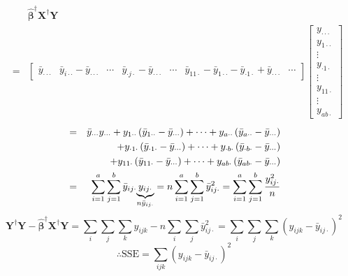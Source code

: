 \documentclass{article}
\begin{document}
\begin{eqnarray*}
&&\mathbf{\hat{\beta}}^{\dagger }\mathbf{X}^{\dagger }\mathbf{Y} \\
&=&\left[ 
\begin{array}{ccccccc}
\bar{y}_{\cdot \cdot \cdot } & \bar{y}_{i\cdot \cdot }-\bar{y}_{\cdot \cdot
\cdot } & \cdots & \bar{y}_{\cdot j\cdot }-\bar{y}_{\cdot \cdot \cdot } & 
\cdots & \bar{y}_{11\cdot }-\bar{y}_{1\cdot \cdot }-\bar{y}_{\cdot 1\cdot }+%
\bar{y}_{\cdot \cdot \cdot } & \cdots%
\end{array}%
\right] \left[ 
\begin{array}{c}
y_{\cdot \cdot \cdot } \\ 
y_{1\cdot \cdot } \\ 
\vdots \\ 
y_{\cdot 1\cdot } \\ 
\vdots \\ 
y_{11\cdot } \\ 
\vdots \\ 
y_{ab\cdot }%
\end{array}%
\right]
\end{eqnarray*}%
\begin{eqnarray*}
&=&\bar{y}_{\cdot \cdot \cdot }y_{\cdot \cdot \cdot }+y_{1\cdot \cdot
}\left( \bar{y}_{1\cdot \cdot }-\bar{y}_{\cdot \cdot \cdot }\right) +\cdots
+y_{a\cdot \cdot }\left( \bar{y}_{a\cdot \cdot }-\bar{y}_{\cdot \cdot \cdot
}\right) \\
&&+y_{\cdot 1\cdot }\left( \bar{y}_{\cdot 1\cdot }-\bar{y}_{\cdot \cdot
\cdot }\right) +\cdots +y_{\cdot b\cdot }\left( \bar{y}_{\cdot b\cdot }-\bar{%
y}_{\cdot \cdot \cdot }\right) \\
&&+y_{11\cdot }\left( \bar{y}_{11\cdot }-\bar{y}_{\cdot \cdot \cdot }\right)
+\cdots +y_{ab\cdot }\left( \bar{y}_{ab\cdot }-\bar{y}_{\cdot \cdot \cdot
}\right) \\
&=&\sum\limits_{i=1}^{a}\sum_{j=1}^{b}\bar{y}_{ij\cdot }\underset{n\bar{y}%
_{ij\cdot }}{\underbrace{y_{ij\cdot }}}=n\sum\limits_{i=1}^{a}\sum_{j=1}^{b}%
\bar{y}_{ij\cdot }^{2}=\sum\limits_{i=1}^{a}\sum_{j=1}^{b}\frac{y_{ij\cdot
}^{2}}{n}
\end{eqnarray*}%
\begin{equation*}
\mathbf{Y}^{\dagger }\mathbf{Y}-\mathbf{\hat{\beta}}^{\dagger }\mathbf{X}%
^{\dagger }\mathbf{Y}=\sum\limits_{i}\sum\limits_{j}\sum\limits_{k}y_{ijk}-n%
\sum\limits_{i}\sum\limits_{j}\bar{y}_{ij\cdot
}^{2}=\sum\limits_{i}\sum\limits_{j}\sum\limits_{k}\left( y_{ijk}-\bar{y}%
_{ij\cdot }\right) ^{2}
\end{equation*}%
\begin{equation*}
\therefore \text{SSE}=\sum\limits_{ijk}\left( y_{ijk}-\bar{y}_{ij\cdot
}\right) ^{2}
\end{equation*}
\end{document}
